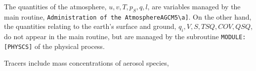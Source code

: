 The quantities of the atmosphere, \(u, v, T, p_S, q, l\), are variables
managed by the main routine,
\texttt{Administration\ of\ the\ Atmosphere\textquotesingle{}{[}AGCM5\textbackslash{}a{]}}.
On the other hand, the quantities relating to the earth's surface and
ground, \(q_i, V, S, TSQ, COV, QSQ\), do not appear in the main routine,
but are managed by the subroutine \texttt{MODULE:{[}PHYSCS{]}} of the
physical process.

Tracers include mass concentrations of aerosol species,
